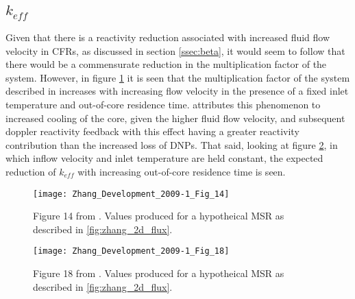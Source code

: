 \documentclass[review]{elsarticle}
\begin{document}
\subsection{$k_{eff}$} \label{ssec:keff}
Given that there is a reactivity reduction associated with increased fluid flow
velocity in CFRs, as discussed in section \ref{ssec:beta}, it would seem to follow
that there would be a commensurate reduction in the multiplication factor of
the system. However, in figure \ref{fig:zhang_velocity_keff} it is seen that the
multiplication factor of the system described in \cite{zhang_development_2009-1}
increases with increasing flow velocity in the presence of a fixed inlet temperature and out-of-core
residence time. \cite{zhang_development_2009-1} attributes
this phenomenon to increased cooling of the core, given the higher fluid flow 
velocity, and subsequent doppler reactivity feedback with this effect
having a greater reactivity contribution than the increased loss of DNPs. That
said, looking at figure \ref{fig:zhang_residence_time_keff}, in which inflow
 velocity and inlet temperature are held constant, the expected reduction of
 $k_{eff}$ with increasing out-of-core residence time is seen.


\begin{figure}[h]
   \centering
   \texttt{[image: Zhang\_Development\_2009-1\_Fig\_14]}
   \caption{Figure 14 from \cite{zhang_development_2009-1}. Values produced for a hypotheical
   MSR as described in \ref{fig:zhang_2d_flux}.}
   \label{fig:zhang_velocity_keff}
\end{figure}

\begin{figure}[h]
   \centering
   \texttt{[image: Zhang\_Development\_2009-1\_Fig\_18]}
   \caption{Figure 18 from \cite{zhang_development_2009-1}. Values produced for a hypotheical MSR
   as described in \ref{fig:zhang_2d_flux}.} 
   \label{fig:zhang_residence_time_keff}
\end{figure}
\end{document}

